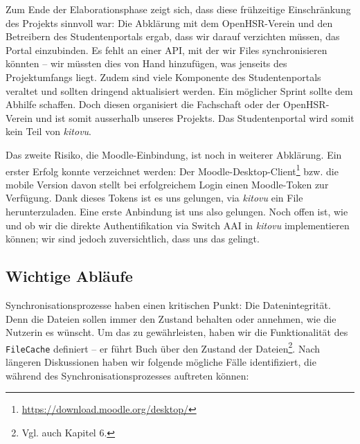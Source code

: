 \documentclass[a4paper]{article}
\begin{document}
Zum Ende der Elaborationsphase zeigt sich, dass diese frühzeitige Einschränkung des Projekts sinnvoll war: Die Abklärung mit dem OpenHSR-Verein und den Betreibern des Studentenportals ergab, dass wir darauf verzichten müssen, das Portal einzubinden. Es fehlt an einer API, mit der wir Files synchronisieren könnten -- wir müssten dies von Hand hinzufügen, was jenseits des Projektumfangs liegt. Zudem sind viele Komponente des Studentenportals veraltet und sollten dringend aktualisiert werden. Ein möglicher Sprint sollte dem Abhilfe schaffen. Doch diesen organisiert die Fachschaft oder der OpenHSR-Verein und ist somit ausserhalb unseres Projekts. Das Studentenportal wird somit kein Teil von \emph{kitovu}.

Das zweite Risiko, die Moodle-Einbindung, ist noch in weiterer Abklärung. Ein erster Erfolg konnte verzeichnet werden: Der Moodle-Desktop-Client\footnote{\url{https://download.moodle.org/desktop/}} bzw. die mobile Version davon stellt bei erfolgreichem Login einen Moodle-Token zur Verfügung. Dank dieses Tokens ist es uns gelungen, via \emph{kitovu} ein File herunterzuladen. Eine erste Anbindung ist uns also gelungen. Noch offen ist, wie und ob wir die direkte Authentifikation via Switch AAI in \emph{kitovu} implementieren können; wir sind jedoch zuversichtlich, dass uns das gelingt.

\subsection{Wichtige Abläufe}

Synchronisationsprozesse haben einen kritischen Punkt: Die Datenintegrität. Denn die Dateien sollen immer den Zustand behalten oder annehmen, wie die Nutzerin es wünscht. Um das zu gewährleisten, haben wir die Funktionalität des \verb|FileCache| definiert -- er führt Buch über den Zustand der Dateien\footnote{Vgl. auch Kapitel 6.}. Nach längeren Diskussionen haben wir folgende mögliche Fälle identifiziert, die während des Synchronisationsprozesses auftreten können:
\end{document}
